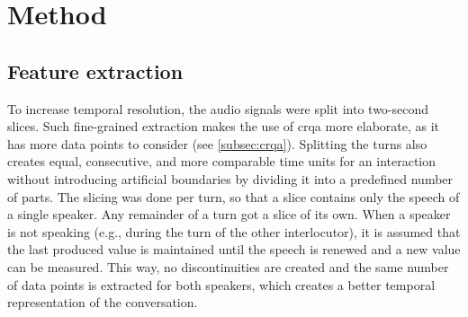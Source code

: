 
\section{Method}
\label{sec:method}

\subsection{Feature extraction}
\label{subsec:feature_extraction}

To increase temporal resolution, the audio signals were split into two-second slices.
Such fine-grained extraction makes the use of \ac{crqa} more elaborate, as it has more data points to consider (see \cref{subsec:crqa}).
Splitting the turns also creates equal, consecutive, and more comparable time units for an interaction without introducing artificial boundaries by dividing it into a predefined number of parts.
The slicing was done per turn, so that a slice contains only the speech of a single speaker.
Any remainder of a turn got a slice of its own.
When a speaker is not speaking (e.g., during the turn of the other interlocutor), it is assumed that the last produced value is maintained until the speech is renewed and a new value can be measured.
This way, no discontinuities are created and the same number of data points is extracted for both speakers, which creates a better temporal representation of the conversation.

